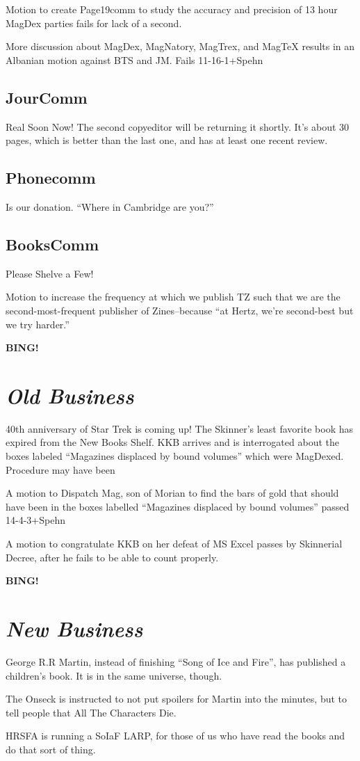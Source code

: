 \documentclass[10pt]{article}
\newcommand{\bing}{{\bf BING!} }
\newcommand{\goto}[1]{\bing \vskip 12pt \section*{{\em{#1}}}}
\begin{document}
Motion to create Page19comm to study the accuracy and precision of 13
hour MagDex parties fails for lack of a second.

More discussion about MagDex, MagNatory, MagTrex, and MagTeX results
in an Albanian motion against BTS and JM.
Fails 11-16-1+Spehn

\subsection*{JourComm}
Real Soon Now! The second copyeditor will be returning it shortly.
It's about 30 pages, which is better than the last one, and has at
least one recent review.

\subsection{Phonecomm}
Is our donation.  ``Where in Cambridge are you?''

\subsection{BooksComm}
Please Shelve a Few!

Motion to increase the frequency at which we publish TZ such that we
are the second-most-frequent publisher of Zines--because ``at
Hertz, we're second-best but we  try harder.''

\goto{Old Business}
40th anniversary of Star Trek is coming up!
The Skinner's least favorite book has expired from the New Books
Shelf.
KKB arrives and is interrogated about the boxes labeled ``Magazines
displaced by bound volumes'' which were MagDexed. Procedure may have
been 

A motion to Dispatch Mag, son of Morian to find the bars of gold that should have
been in the boxes labelled ``Magazines displaced by bound volumes''
passed 14-4-3+Spehn

A motion to congratulate KKB on her defeat of MS Excel passes by
Skinnerial Decree, after he fails to be able to count properly.

\goto{New Business}
George R.R Martin, instead of finishing ``Song of Ice and Fire'', has published
a children's book.  It is in the same universe, though.

The Onseck is instructed to not put spoilers for Martin into the
minutes, but to tell people that All The Characters Die.

HRSFA is running a SoIaF LARP, for those of us who have read the books
and do that sort of thing.
\end{document}
